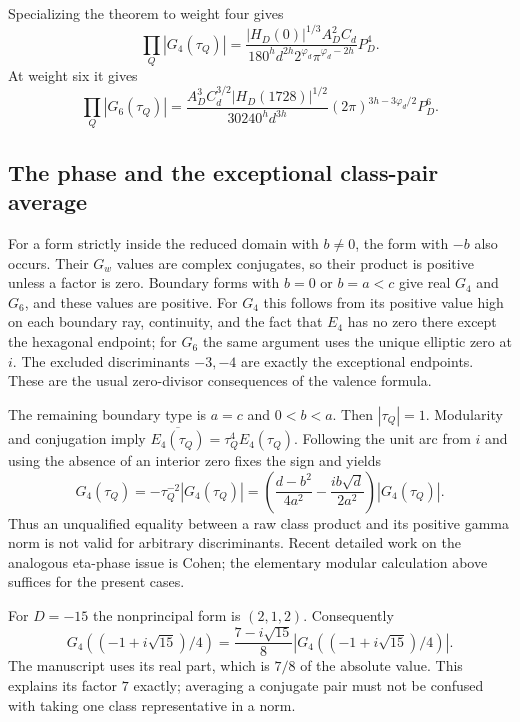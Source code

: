 Specializing the theorem to weight four gives
\begin{equation}
 \prod_Q|G_4(\tau_Q)|
 =\frac{|H_D(0)|^{1/3}A_D^2C_d}
        {180^h d^{2h}2^{\varphi_d}\pi^{\varphi_d-2h}}P_D^4.
 \label{cmnorm:eq:weightfour}
\end{equation}
At weight six it gives
\begin{equation}
 \prod_Q|G_6(\tau_Q)|
 =\frac{A_D^3C_d^{3/2}|H_D(1728)|^{1/2}}
        {30240^h d^{3h}}
   (2\pi)^{3h-3\varphi_d/2}P_D^6.
 \label{cmnorm:eq:weightsix}
\end{equation}



\subsection{The phase and the exceptional class-pair average}
\label{cmnorm:sec:phase}

For a form strictly inside the reduced domain with $b\neq0$, the form
with $-b$ also occurs. Their $G_w$ values are complex conjugates, so their
product is positive unless a factor is zero. Boundary forms with $b=0$
or $b=a<c$ give real $G_4$ and $G_6$, and these values are positive.
For $G_4$ this follows from its positive value high on each boundary ray,
continuity, and the fact that $E_4$ has no zero there except the hexagonal
endpoint; for $G_6$ the same argument uses the unique elliptic zero at $i$.
The excluded discriminants $-3,-4$ are exactly the exceptional endpoints.
These are the usual zero-divisor consequences of the valence formula.

The remaining boundary type is $a=c$ and $0<b<a$. Then $|\tau_Q|=1$.
Modularity and conjugation imply
$\overline{E_4(\tau_Q)}=\tau_Q^4E_4(\tau_Q)$.
Following the unit arc from $i$ and using the absence of an interior zero
fixes the sign and yields
\begin{equation}
 G_4(\tau_Q)=-\tau_Q^{-2}|G_4(\tau_Q)|
 =\left(\frac{d-b^2}{4a^2}
         -\frac{ib\sqrt d}{2a^2}\right)|G_4(\tau_Q)|.
 \label{cmnorm:eq:arcphase}
\end{equation}
Thus an unqualified equality between a raw class product and its positive
gamma norm is not valid for arbitrary discriminants. Recent detailed work
on the analogous eta-phase issue is Cohen\cite{cmnorm:Cohen2026};
the elementary modular calculation above suffices for the present cases.

For $D=-15$ the nonprincipal form is $(2,1,2)$. Consequently
\[
 G_4((-1+i\sqrt{15})/4)
 =\frac{7-i\sqrt{15}}8
       |G_4((-1+i\sqrt{15})/4)|.
\]
The manuscript uses its real part, which is $7/8$ of the absolute value.
This explains its factor $7$ exactly; averaging a conjugate pair must
not be confused with taking one class representative in a norm.

